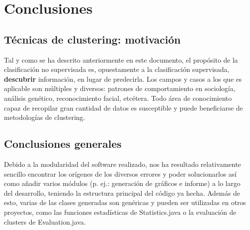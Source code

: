 \documentclass[10pt,a4paper]{article}
\begin{document}
%
%
%



\section{Conclusiones}

\subsection{Técnicas de clustering: motivación}
Tal y como se ha descrito anteriormente en este documento, el propósito de la
clasificación no supervisada es, opuestamente a la clasificación supervisada,
\textbf{descubrir} información, en lugar de predecirla. Los campos y casos a los
que es aplicable son múltiples y diversos: patrones de comportamiento en
sociología, análisis genético, reconocimiento facial, etcétera. Todo área de
conocimiento capaz de recopilar gran cantidad de datos es susceptible y puede
beneficiarse de metodologías de clustering.


\subsection{Conclusiones generales}
Debido a la modularidad del software realizado, nos ha resultado relativamente
sencillo encontrar los orígenes de los diversos errores y poder solucionarlos
así como añadir varios módulos (p. ej.:
generación de gráficos e informe) a lo largo del desarrollo, teniendo la
estructura principal del código ya hecha. Además de esto, varias de las clases
generadas son genéricas y pueden ser utilizadas en otros proyectos, como las 
funciones estadísticas de Statistics.java o la evaluación de clusters de Evaluation.java.\\
\end{document}
